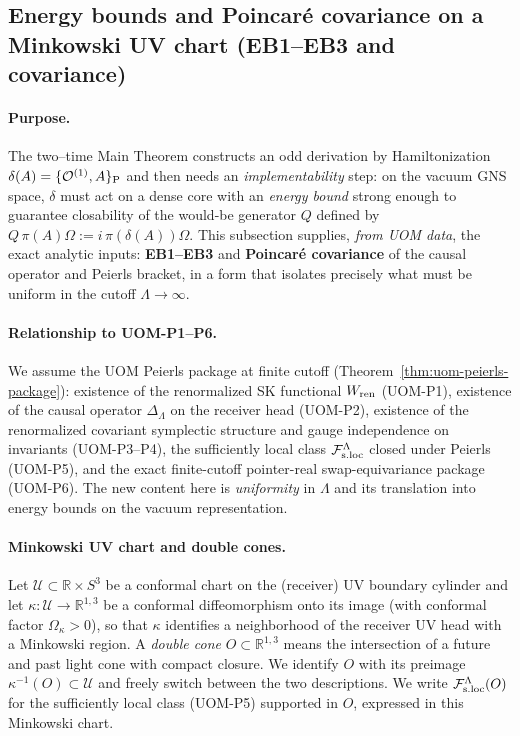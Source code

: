 \documentclass[10pt]{article}
\theoremstyle{definition}
\theoremstyle{plain}
\begin{document}
\subsection{Energy bounds and Poincar\'e covariance on a Minkowski UV chart (EB1--EB3 and covariance)}
\label{subsec:uom-energy-bounds}

\paragraph{Purpose.}
The two--time Main Theorem constructs an odd derivation by Hamiltonization
\(
\delta(A)=\{\mathcal O^{(1)},A\}_{\rm P}
\)
and then needs an \emph{implementability} step: on the vacuum GNS space,
$\delta$ must act on a dense core with an \emph{energy bound} strong enough
to guarantee closability of the would-be generator $Q$ defined by
$Q\,\pi(A)\Omega:=i\,\pi(\delta(A))\Omega$.
This subsection supplies, \emph{from UOM data}, the exact analytic inputs:
\textbf{EB1--EB3} and \textbf{Poincar\'e covariance} of the causal operator and Peierls bracket,
in a form that isolates precisely what must be uniform in the cutoff
\(\Lambda\to\infty\).

\paragraph{Relationship to UOM-P1--P6.}
We assume the UOM Peierls package at finite cutoff (Theorem~\ref{thm:uom-peierls-package}):
existence of the renormalized SK functional $W_{\rm ren}$ (UOM-P1),
existence of the causal operator $\Delta_\Lambda$ on the receiver head (UOM-P2),
existence of the renormalized covariant symplectic structure and gauge independence on invariants (UOM-P3--P4),
the sufficiently local class $\mathcal F_{\rm s.loc}^\Lambda$ closed under Peierls (UOM-P5),
and the exact finite-cutoff pointer-real swap-equivariance package (UOM-P6).
The new content here is \emph{uniformity} in $\Lambda$ and its translation into energy bounds
on the vacuum representation.


\paragraph{Minkowski UV chart and double cones.}
Let $\mathscr U\subset \mathbb R\times S^3$ be a conformal chart on the (receiver) UV boundary cylinder
and let $\kappa:\mathscr U\to \mathbb R^{1,3}$ be a conformal diffeomorphism onto its image
(with conformal factor $\Omega_\kappa>0$), so that $\kappa$ identifies a neighborhood of the
receiver UV head with a Minkowski region.  A \emph{double cone} $O\subset \mathbb R^{1,3}$ means the
intersection of a future and past light cone with compact closure.  We identify $O$ with its preimage
$\kappa^{-1}(O)\subset\mathscr U$ and freely switch between the two descriptions.  We write
$\mathcal F_{\rm s.loc}^\Lambda(O)$ for the sufficiently local class (UOM-P5) supported in $O$,
expressed in this Minkowski chart.
\end{document}
